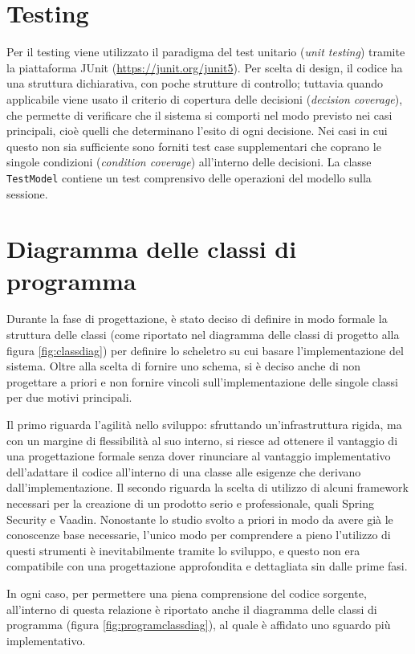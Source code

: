 \section{Testing}\label{testing}
Per il testing viene utilizzato il paradigma del test unitario (\emph{unit testing}) tramite la piattaforma JUnit (\url{https://junit.org/junit5}). Per scelta di design, il codice ha una struttura dichiarativa, con poche strutture di controllo; tuttavia quando applicabile viene usato il criterio di copertura delle decisioni (\emph{decision coverage}), che permette di verificare che il sistema si comporti nel modo previsto nei casi principali, cioè quelli che determinano l'esito di ogni decisione. Nei casi in cui questo non sia sufficiente sono forniti test case supplementari che coprano le singole condizioni (\emph{condition coverage}) all'interno delle decisioni. La classe \verb!TestModel! contiene un test comprensivo delle operazioni del modello sulla sessione.




\section{Diagramma delle classi di programma}\label{implclassi}
Durante la fase di progettazione, è stato deciso di definire in modo formale la struttura delle classi (come riportato nel diagramma delle classi di progetto alla figura \ref{fig:classdiag}) per definire lo scheletro su cui basare l'implementazione del sistema.
Oltre alla scelta di fornire uno schema, si è deciso anche di non progettare a priori e non fornire vincoli sull'implementazione delle singole classi per due motivi principali.

Il primo riguarda l'agilità nello sviluppo: sfruttando un'infrastruttura rigida, ma con un margine di flessibilità al suo interno, si riesce ad ottenere il vantaggio di una progettazione formale senza dover rinunciare al vantaggio implementativo dell'adattare il codice all'interno di una classe alle esigenze che derivano dall'implementazione.
Il secondo riguarda la scelta di utilizzo di alcuni framework necessari per la creazione di un prodotto serio e professionale, quali Spring Security e Vaadin. Nonostante lo studio svolto a priori in modo da avere già le conoscenze base necessarie, l'unico modo per comprendere a pieno l'utilizzo di questi strumenti è inevitabilmente tramite lo sviluppo, e questo non era compatibile con una progettazione approfondita e dettagliata sin dalle prime fasi.

In ogni caso, per permettere una piena comprensione del codice sorgente, all'interno di questa relazione è riportato anche il diagramma delle classi di programma (figura \ref{fig:programclassdiag}), al quale è affidato uno sguardo più implementativo.

